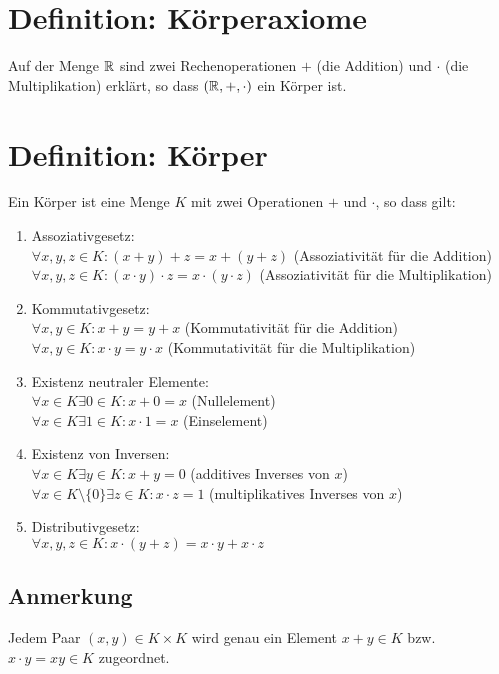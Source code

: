 \section*{Definition: Körperaxiome}\label{Koerperaxiome}
Auf der Menge $\mathbb{R}$ sind zwei Rechenoperationen $+$ (die Addition) und $\cdot$ (die Multiplikation) erklärt, so dass $(\mathbb{R}, +, \cdot)$ ein Körper ist.

\section{Definition: Körper}\label{3.2}
Ein Körper ist eine Menge $K$ mit zwei Operationen $+$ und $\cdot$, so dass gilt:
\begin{enumerate}[label=(K\arabic*)]
\item Assoziativgesetz:\\
$\forall x,y,z \in K : (x+y)+z = x+(y+z)$ (Assoziativität für die Addition)\\
$\forall x,y,z \in K : (x \cdot y) \cdot z = x \cdot (y \cdot z)$ (Assoziativität für die Multiplikation)
\item Kommutativgesetz:\\
$\forall x,y \in K : x+y = y+x$ (Kommutativität für die Addition)\\
$\forall x,y \in K : x \cdot y = y \cdot x$ (Kommutativität für die Multiplikation)
\item Existenz neutraler Elemente:\\
$\forall x \in K \exists 0 \in K : x+0 = x$ (Nullelement)\\
$\forall x \in K \exists 1 \in K : x \cdot 1 = x$ (Einselement)
\item Existenz von Inversen:\\
$\forall x \in K \exists y \in K : x+y = 0$ (additives Inverses von $x$)\\
$\forall x \in K \setminus \{0\} \exists z \in K : x \cdot z = 1$ (multiplikatives Inverses von $x$)
\item Distributivgesetz:\\
$\forall x,y,z \in K : x \cdot (y+z) = x \cdot y + x \cdot z$
\end{enumerate}

\subsection*{Anmerkung}
Jedem Paar $(x,y) \in K \times K$ wird genau ein Element $x+y \in K$ bzw. $x \cdot y = xy \in K$ zugeordnet.


